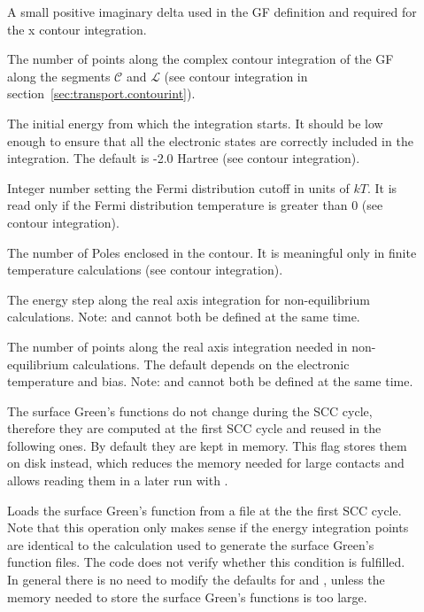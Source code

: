 \begin{description}
\item[] A small positive imaginary delta used
  in the GF definition and required for the x contour integration.
\item[] The number of points along the complex contour
  integration of the GF along the segments $\mathcal{C}$ and $\mathcal{L}$ (see
  contour integration in section~\ref{sec:transport.contourint}).
\item[] The initial energy from which
  the integration starts. It should be low enough to ensure that all the
  electronic states are correctly included in the integration. The default is
  -2.0 Hartree (see contour integration).
\item[] Integer number setting the Fermi distribution cutoff in
  units of $kT$. It is read only if the Fermi distribution temperature is
  greater than 0 (see contour integration).
\item[] The number of Poles enclosed in the contour. It is
  meaningful only in finite temperature calculations (see contour integration).
\item[] The energy step along the real
  axis integration for non-equilibrium calculations. Note:  and
   cannot both be defined at the same time.

\item[] The number of points along the real axis integration
  needed in non-equilibrium calculations. The default depends on the electronic
  temperature and bias. Note:  and  cannot
  both be defined at the same time.

\item[] The surface Green's functions do not change during
  the SCC cycle, therefore they are computed at the first SCC cycle and reused in
  the following ones. By default they are kept in memory. This flag stores them
  on disk instead, which reduces the memory needed for large contacts and allows
  reading them in a later run with .

\item[] Loads the surface Green's function from a file at the
  the first SCC cycle. Note that this operation only makes sense if the energy
  integration points are identical to the calculation used to generate the
  surface Green's function files. The code does not verify whether this
  condition is fulfilled. In general there is no need to modify the defaults for
   and , unless the memory needed to store
  the surface Green's functions is too large.


\end{description}
